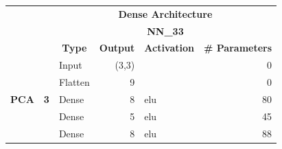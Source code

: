 \begin{table}[H]
\centering
\begin{center}
\begin{tabular}{ll|l|r|l|r|}
\cline{3-6}
                                                    &                             & \multicolumn{4}{c|}{\textbf{Dense Architecture}}                                                                                                           \\ \cline{3-6} 
                                                    &                             & \multicolumn{4}{c|}{\textbf{NN\_33}}                                                                                                                                   \\ \cline{3-6} 
                                                    &                             & \multicolumn{1}{c|}{\textbf{Type}} & \multicolumn{1}{c|}{\textbf{Output}} & \multicolumn{1}{c|}{\textbf{Activation}} & \multicolumn{1}{l|}{\textbf{\# Parameters}} \\ \hline
\multicolumn{1}{|l|}{\multirow{7}{*}{\textbf{PCA}}} & \multirow{7}{*}{\textbf{3}} & Input                              & (3,3)                                &                                          & 0                                           \\ \cline{3-6} 
\multicolumn{1}{|l|}{}                              &                             & Flatten                            & 9                                    &                                          & 0                                           \\ \cline{3-6} 
\multicolumn{1}{|l|}{}                              &                             & Dense                              & 8                                   & elu                                     & 80                                          \\ \cline{3-6} 
\multicolumn{1}{|l|}{}                              &                             & Dense                              & 5                                   & elu                                     & 45                                          \\ \cline{3-6} 
\multicolumn{1}{|l|}{}                              &                             & Dense                              & 8                                    & elu                                     & 88                                          \\ \cline{3-6} 

\end{tabular}
\end{center}
\end{table}
